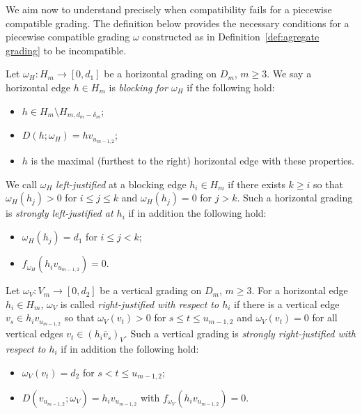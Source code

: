 We aim now to understand precisely when compatibility fails for a piecewise compatible grading. 
The definition below provides the necessary conditions for a piecewise compatible grading $\omega$ constructed as in Definition~\ref{def:agregate grading} to be incompatible.
\begin{definition}
 \label{def:blocking and justification}
 Let $\omega_H:H_m\to[0,d_1]$ be a horizontal grading on $D_m$, $m\ge3$. We say a horizontal edge $h\in H_m$ is \emph{blocking for $\omega_H$} if the following hold:
 \begin{itemize}
 \item $h\in H_m\setminus H_{m,d_m-\delta_m}$;
 \item $D(h;\omega_H)=hv_{u_{m-1,2}}$;
 \item $h$ is the maximal (\ie furthest to the right) horizontal edge with these properties.
 \end{itemize}
 We call $\omega_H$ \emph{left-justified} at a blocking edge $h_i\in H_m$ if there exists $k\ge i$ so that $\omega_H(h_j)>0$ for $i\le j\le k$ and $\omega_H(h_j)=0$ for $j>k$. 
 Such a horizontal grading is \emph{strongly left-justified at $h_i$} if in addition the following hold:
 \begin{itemize}
 \item $\omega_H(h_j)=d_1$ for $i\le j<k$;
 \item $f_{\omega_H}(h_iv_{u_{m-1,2}})=0$.
 \end{itemize}
 Let $\omega_V:V_m\to[0,d_2]$ be a vertical grading on $D_m$, $m\ge3$. 
 For a horizontal edge $h_i\in H_m$, $\omega_V$ is called \emph{right-justified with respect to $h_i$} if there is a vertical edge $v_s\in h_iv_{u_{m-1,2}}$ so that $\omega_V(v_t)>0$ for $s\le t\le u_{m-1,2}$ and $\omega_V(v_t)=0$ for all vertical edges $v_t\in(h_i\overline{v}_s)_V$. 
 Such a vertical grading is \emph{strongly right-justified with respect to $h_i$} if in addition the following hold:
 \begin{itemize}
 \item $\omega_V(v_t)=d_2$ for $s<t\le u_{m-1,2}$;
 \item $D(v_{u_{m-1,2}};\omega_V)=h_iv_{u_{m-1,2}}$ with $f_{\omega_V}(h_iv_{u_{m-1,2}})=0$.
 \end{itemize}
\end{definition}

